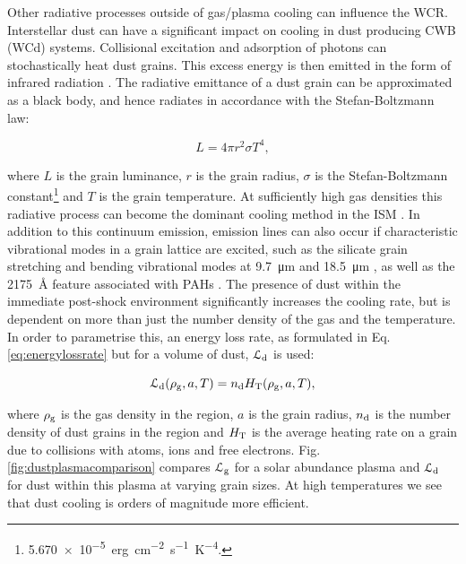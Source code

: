 Other radiative processes outside of gas/plasma cooling can influence the WCR.
Interstellar dust can have a significant impact on cooling in dust producing CWB (WCd) systems.
Collisional excitation and adsorption of photons can stochastically heat dust grains.
This excess energy is then emitted in the form of infrared radiation \parencite{dwekCoolingSputteringInfrared1996}.
The radiative emittance of a dust grain can be approximated as a black body, and hence radiates in accordance with the Stefan-Boltzmann law:

\begin{equation}
  L = 4\pi r^2 \sigma T^4 , 
\end{equation}

\noindent
where $L$ is the grain luminance, $r$ is the grain radius, $\sigma$ is the Stefan-Boltzmann constant\footnote{\SI{5.670e-5}{erg.cm^{-2}.s^{-1}.K^{-4}}.} and $T$ is the grain temperature.
At sufficiently high gas densities this radiative process can become the dominant cooling method in the ISM \parencite{wolfireNeutralAtomicPhases1995}.
In addition to this continuum emission, emission lines can also occur if characteristic vibrational modes in a grain lattice are excited, such as the silicate grain stretching and bending vibrational modes at \SI{9.7}{\micro\metre} and \SI{18.5}{\micro\metre} \parencite[212]{whittetDustGalacticEnvironment2002}, as well as the \SI{2175}{\angstrom} feature associated with PAHs \parencite{draineInterstellarDustGrains2003}.
The presence of dust within the immediate post-shock environment significantly increases the cooling rate, but is dependent on more than just the number density of the gas and the temperature.
In order to parametrise this, an energy loss rate, as formulated in Eq. \ref{eq:energylossrate} but for a volume of dust, $\mathcal{L}_\text{d}$ is used:

\begin{equation}
  \mathcal{L}_\text{d} (\rho_\text{g},a,T) = n_\text{d} H_\text{T}(\rho_\text{g},a,T) , 
\end{equation}

\noindent
where $\rho_\text{g}$ is the gas density in the region, $a$ is the grain radius, $n_\text{d}$ is the number density of dust grains in the region and $H_\text{T}$ is the average heating rate on a grain due to collisions with atoms, ions and free electrons.
Fig. \ref{fig:dustplasmacomparison} compares $\mathcal{L}_\text{g}$ for a solar abundance plasma and $\mathcal{L}_\text{d}$ for dust within this plasma at varying grain sizes.
At high temperatures we see that dust cooling is orders of magnitude more efficient.

